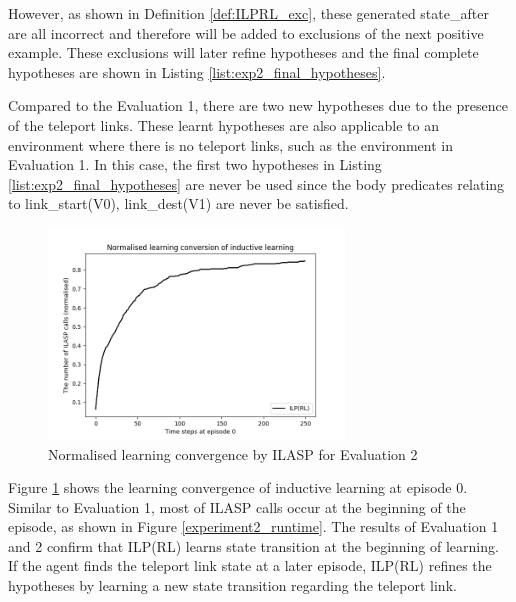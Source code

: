 However, as shown in Definition \ref{def:ILPRL_exc}, these generated \textsf{state\_after} are all incorrect and therefore will be added to exclusions of the next positive example.
These exclusions will later refine hypotheses and the final complete hypotheses are shown in Listing \ref{list:exp2_final_hypotheses}.



Compared to the Evaluation 1, there are two new hypotheses due to the presence of the teleport links.
These learnt hypotheses are also applicable to an environment where there is no teleport links, such as the environment in Evaluation 1.
In this case, the first two hypotheses in Listing \ref{list:exp2_final_hypotheses} are never be used 
since the body predicates relating to link\_start(V0), link\_dest(V1) are never be satisfied.

\begin{figure}[!htb]
\centering
\includegraphics[width=0.7\textwidth]{./figures/experiment2_ilasp}
\caption{Normalised learning convergence by ILASP for Evaluation 2}
\label{experiment2_ilasp}
\end{figure}

Figure \ref{experiment2_ilasp} shows the learning convergence of inductive learning at episode 0.
Similar to Evaluation 1, most of ILASP calls occur at the beginning of the episode, as shown in Figure \ref{experiment2_runtime}.
The results of Evaluation 1 and 2 confirm that ILP(RL) learns state transition at the beginning of learning.
If the agent finds the teleport link state at a later episode, ILP(RL) refines the hypotheses by learning a new state transition regarding the teleport link.

